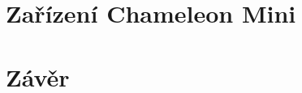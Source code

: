 



\chapter{Zařízení Chameleon Mini}
\label{zarizeni_chameleon_mini}







\chapter{Závěr}
\label{zaver}



